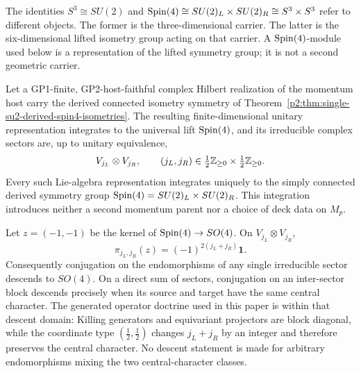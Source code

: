 \documentclass[12pt,a4paper]{article}
\begin{document}
\begin{remark}
\label{p2:rem:carrier-symmetry-module-boundary}
The identities
\(S^3\cong SU(2)\) and
\(\mathrm{Spin}(4)\cong SU(2)_L\times SU(2)_R\cong S^3\times S^3\) refer to
different objects.  The former is the three-dimensional carrier.  The latter
is the six-dimensional lifted isometry group acting on that carrier.  A
\(\mathrm{Spin}(4)\)-module used below is a representation of the lifted symmetry
group; it is not a second geometric carrier.
\end{remark}

\begin{proposition}
\label{p2:prop:algebra-sector-grammar}
Let a GP1-finite, GP2-host-faithful complex Hilbert realization of the momentum
host carry the derived connected isometry symmetry of
Theorem~\ref{p2:thm:single-su2-derived-spin4-isometries}.  The resulting
finite-dimensional unitary representation integrates to the universal lift
\(\mathrm{Spin}(4)\), and its irreducible complex sectors are, up to unitary
equivalence,
\[
 V_{j_L}\otimes V_{j_R},
 \qquad
 (j_L,j_R)\in
 \tfrac12\mathbb{Z}_{\ge0}\times\tfrac12\mathbb{Z}_{\ge0}.
\]
Every such Lie-algebra representation integrates uniquely to the simply
connected derived symmetry group
\(\mathrm{Spin}(4)=SU(2)_L\times SU(2)_R\).  This integration introduces neither a
second momentum parent nor a choice of deck data on \(M_p\).

Let \(z=(-1,-1)\) be the kernel of
\(\mathrm{Spin}(4)\to SO(4)\).  On \(V_{j_L}\otimes V_{j_R}\),
\[
 \pi_{j_L,j_R}(z)
 =
 (-1)^{2(j_L+j_R)}\mathbf1.
\]
Consequently conjugation on the endomorphisms of any single irreducible sector
descends to \(SO(4)\).  On a direct sum of sectors, conjugation on an
inter-sector block descends precisely when its source and target have the same
central character.  The generated operator doctrine used in this paper is
within that descent domain: Killing generators and equivariant projectors are
block diagonal, while the coordinate type
\((\tfrac12,\tfrac12)\) changes \(j_L+j_R\) by an integer and therefore
preserves the central character.  No descent statement is made for arbitrary
endomorphisms mixing the two central-character classes.
\end{proposition}
\end{document}
